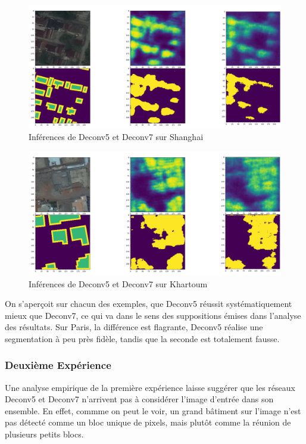 \documentclass[a4paper, 11pt]{report}
\begin{document}
\begin{figure}[H]
	\begin{center}
		\includegraphics[scale=0.225]{Images/Deconvs_Shanghai.png}
		\caption{Inférences de Deconv5 et Deconv7 sur Shanghai}
	\end{center}
\end{figure}

\begin{figure}[H]
	\begin{center}
		\includegraphics[scale=0.225]{Images/Deconvs_Khartoum.png}
		\caption{Inférences de Deconv5 et Deconv7 sur Khartoum}
	\end{center}
\end{figure}

On s'aperçoit sur chacun des exemples, que Deconv5 réussit systématiquement mieux que Deconv7, ce qui va dans le sens des suppositions émises dans l'analyse des résultats.
Sur Paris, la différence est flagrante, Deconv5 réalise une segmentation à peu près fidèle, tandis que la seconde est totalement fausse.

\subsubsection{Deuxième Expérience}
Une analyse empirique de la première expérience laisse suggérer que les réseaux Deconv5 et Deconv7 n'arrivent pas à considérer l'image d'entrée dans son ensemble.
En effet, commme on peut le voir, un grand bâtiment sur l'image n'est pas détecté comme un bloc unique de pixels, mais plutôt comme la réunion de plusieurs petits blocs.
\end{document}
